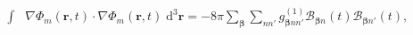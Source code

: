 \documentclass{article}
\begin{document}
\begin{equation}
\begin{split}
\int&\nabla\Phi_m(\mathbf{r},t)\cdot\nabla\Phi_m(\mathbf{r},t)\;\mathrm{d}^3\mathbf{r}
= -8\pi\sum_{\bm{\beta}}\sum_{nn'}g_{\bm{\beta}nn'}^{(1)}\mathcal{B}_{\bm{\beta}n}(t)\mathcal{B}_{\bm{\beta}n'}(t),
\end{split}
\end{equation}
\end{document}
